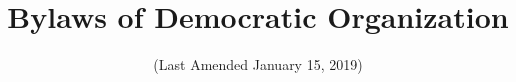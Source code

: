 \documentclass{article}
\begin{document}
\title{Bylaws of \thedistrict{} Democratic Organization}
\date{(Last Amended January 15, 2019)}
\maketitle

\setcounter{tocdepth}{1}
\tableofcontents


\end{document}
